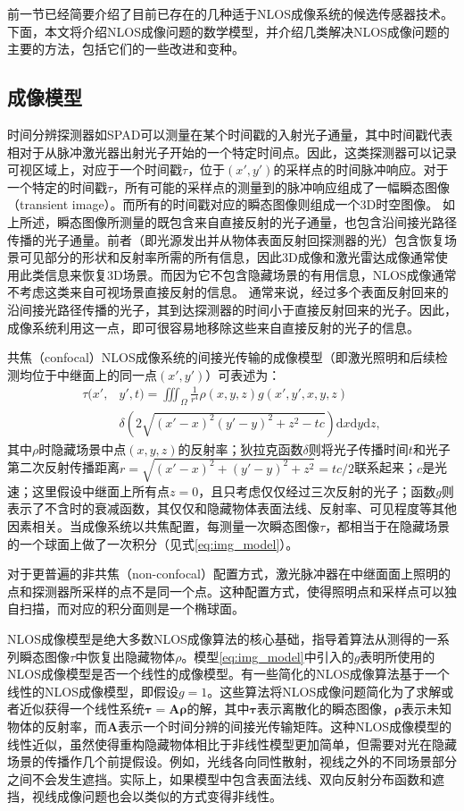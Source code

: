 \documentclass[master]{shtthesis}             %
\begin{document}
前一节已经简要介绍了目前已存在的几种适于NLOS成像系统的候选传感器技术。下面，本文将介绍NLOS成像问题的数学模型，并介绍几类解决NLOS成像问题的主要的方法，包括它们的一些改进和变种。

\subsection{成像模型}

时间分辨探测器如SPAD可以测量在某个时间戳的入射光子通量，其中时间戳代表相对于从脉冲激光器出射光子开始的一个特定时间点。因此，这类探测器可以记录可视区域上，对应于一个时间戳$\tau$，位于$(x',y')$的采样点的时间脉冲响应。对于一个特定的时间戳$\tau$，所有可能的采样点的测量到的脉冲响应组成了一幅瞬态图像（transient image）。而所有的时间戳对应的瞬态图像则组成一个3D时空图像。
如上所述，瞬态图像所测量的既包含来自直接反射的光子通量，也包含沿间接光路径传播的光子通量。前者（即光源发出并从物体表面反射回探测器的光）包含恢复场景可见部分的形状和反射率所需的所有信息，因此3D成像和激光雷达成像通常使用此类信息来恢复3D场景。而因为它不包含隐藏场景的有用信息，NLOS成像通常不考虑这类来自可视场景直接反射的信息。
通常来说，经过多个表面反射回来的沿间接光路径传播的光子，其到达探测器的时间小于直接反射回来的光子。因此，成像系统利用这一点，即可很容易地移除这些来自直接反射的光子的信息。

共焦（confocal）NLOS成像系统的间接光传输的成像模型（即激光照明和后续检测均位于中继面上的同一点$(x',y')$）可表述为：
\begin{equation}\label{eq:img_model}
  \begin{split}
    \tau(x',&y',t)=\iiint_\Omega \frac{1}{r^4}\rho(x,y,z)g(x',y',x,y,z)\\ &\delta\left(2\sqrt{(x'-x)^2(y'-y)^2+z^2-tc}\right)\text{d}x\text{d}y\text{d}z,
  \end{split}
\end{equation}
其中$\rho$时隐藏场景中点$(x,y,z)$的反射率；狄拉克函数$\delta$则将光子传播时间$t$和光子第二次反射传播距离$r=\sqrt{(x'-x)^2+(y'-y)^2+z^2}=tc/2$联系起来；$c$是光速；这里假设中继面上所有点$z=0$，且只考虑仅仅经过三次反射的光子；函数$g$则表示了不含时的衰减函数，其仅仅和隐藏物体表面法线、反射率、可见程度等其他因素相关。当成像系统以共焦配置，每测量一次瞬态图像$\tau$，都相当于在隐藏场景的一个球面上做了一次积分（见式\ref{eq:img_model}）。

对于更普遍的非共焦（non-confocal）配置方式，激光脉冲器在中继面面上照明的点和探测器所采样的点不是同一个点。这种配置方式，使得照明点和采样点可以独自扫描，而对应的积分面则是一个椭球面。

NLOS成像模型是绝大多数NLOS成像算法的核心基础，指导着算法从测得的一系列瞬态图像$\tau$中恢复出隐藏物体$\rho$。模型\ref{eq:img_model}中引入的$g$表明所使用的NLOS成像模型是否一个线性的成像模型。有一些简化的NLOS成像算法基于一个线性的NLOS成像模型，即假设$g=1$。这些算法将NLOS成像问题简化为了求解或者近似获得一个线性系统$\mathbf{\tau=A\rho}$的解，其中$\mathbf{\tau}$表示离散化的瞬态图像，$\mathbf{\rho}$表示未知物体的反射率，而$\mathbf{A}$表示一个时间分辨的间接光传输矩阵。这种NLOS成像模型的线性近似，虽然使得重构隐藏物体相比于非线性模型更加简单，但需要对光在隐藏场景的传播作几个前提假设。例如，光线各向同性散射，视线之外的不同场景部分之间不会发生遮挡。实际上，如果模型中包含表面法线、双向反射分布函数和遮挡，视线成像问题也会以类似的方式变得非线性。
\end{document}
